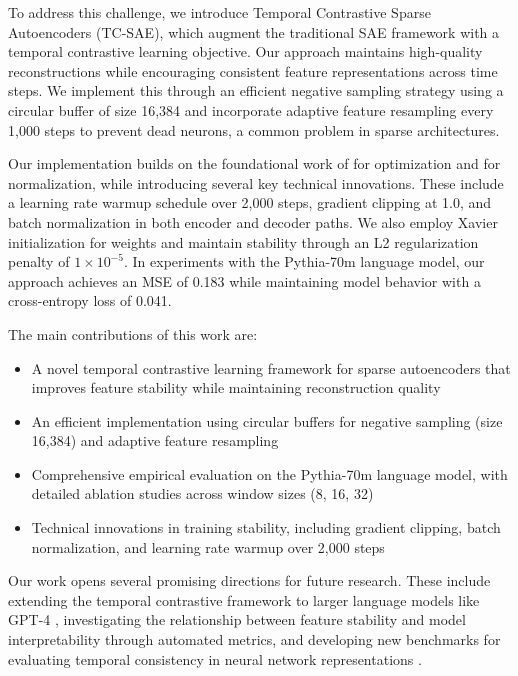 \documentclass{article} %
\begin{document}
To address this challenge, we introduce Temporal Contrastive Sparse Autoencoders (TC-SAE), which augment the traditional SAE framework with a temporal contrastive learning objective. Our approach maintains high-quality reconstructions while encouraging consistent feature representations across time steps. We implement this through an efficient negative sampling strategy using a circular buffer of size 16,384 and incorporate adaptive feature resampling every 1,000 steps to prevent dead neurons, a common problem in sparse architectures.

Our implementation builds on the foundational work of \cite{kingma2014adam} for optimization and \cite{ba2016layer} for normalization, while introducing several key technical innovations. These include a learning rate warmup schedule over 2,000 steps, gradient clipping at 1.0, and batch normalization in both encoder and decoder paths. We also employ Xavier initialization for weights and maintain stability through an L2 regularization penalty of $1\times10^{-5}$. In experiments with the Pythia-70m language model, our approach achieves an MSE of 0.183 while maintaining model behavior with a cross-entropy loss of 0.041.

The main contributions of this work are:
\begin{itemize}
    \item A novel temporal contrastive learning framework for sparse autoencoders that improves feature stability while maintaining reconstruction quality
    \item An efficient implementation using circular buffers for negative sampling (size 16,384) and adaptive feature resampling
    \item Comprehensive empirical evaluation on the Pythia-70m language model, with detailed ablation studies across window sizes (8, 16, 32)
    \item Technical innovations in training stability, including gradient clipping, batch normalization, and learning rate warmup over 2,000 steps
\end{itemize}

Our work opens several promising directions for future research. These include extending the temporal contrastive framework to larger language models like GPT-4 \cite{gpt4}, investigating the relationship between feature stability and model interpretability through automated metrics, and developing new benchmarks for evaluating temporal consistency in neural network representations \cite{paszke2019pytorch}.
\end{document}
